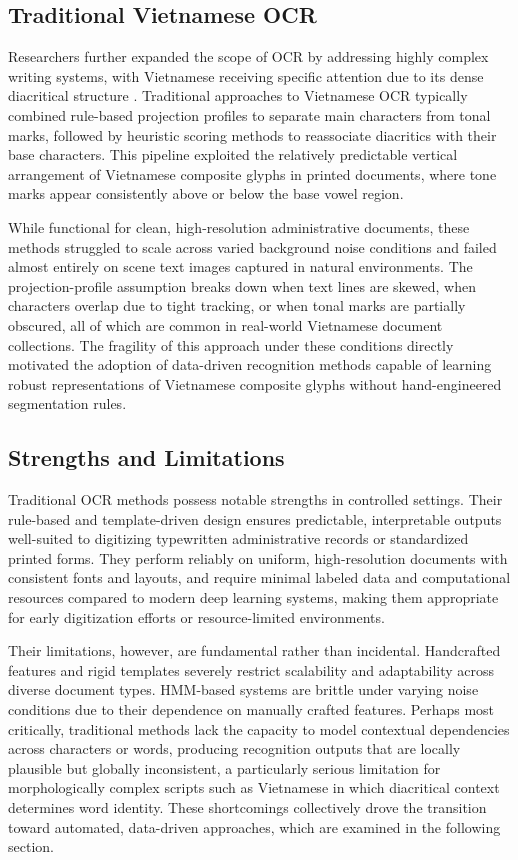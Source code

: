 \subsection{Traditional Vietnamese OCR}

Researchers further expanded the scope of OCR by addressing highly complex writing systems, with Vietnamese receiving specific attention due to its dense diacritical structure \cite{Le2025}. Traditional approaches to Vietnamese OCR typically combined rule-based projection profiles to separate main characters from tonal marks, followed by heuristic scoring methods to reassociate diacritics with their base characters. This pipeline exploited the relatively predictable vertical arrangement of Vietnamese composite glyphs in printed documents, where tone marks appear consistently above or below the base vowel region.

While functional for clean, high-resolution administrative documents, these methods struggled to scale across varied background noise conditions and failed almost entirely on scene text images captured in natural environments. The projection-profile assumption breaks down when text lines are skewed, when characters overlap due to tight tracking, or when tonal marks are partially obscured, all of which are common in real-world Vietnamese document collections. The fragility of this approach under these conditions directly motivated the adoption of data-driven recognition methods capable of learning robust representations of Vietnamese composite glyphs without hand-engineered segmentation rules.

\subsection{Strengths and Limitations}

Traditional OCR methods possess notable strengths in controlled settings. Their rule-based and template-driven design ensures predictable, interpretable outputs well-suited to digitizing typewritten administrative records or standardized printed forms. They perform reliably on uniform, high-resolution documents with consistent fonts and layouts, and require minimal labeled data and computational resources compared to modern deep learning systems, making them appropriate for early digitization efforts or resource-limited environments.

Their limitations, however, are fundamental rather than incidental. Handcrafted features and rigid templates severely restrict scalability and adaptability across diverse document types. HMM-based systems are brittle under varying noise conditions due to their dependence on manually crafted features. Perhaps most critically, traditional methods lack the capacity to model contextual dependencies across characters or words, producing recognition outputs that are locally plausible but globally inconsistent, a particularly serious limitation for morphologically complex scripts such as Vietnamese in which diacritical context determines word identity. These shortcomings collectively drove the transition toward automated, data-driven approaches, which are examined in the following section.
